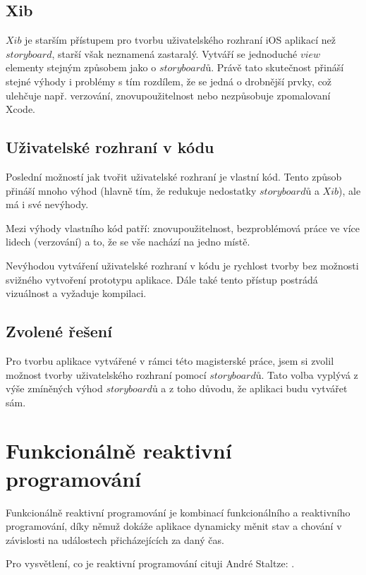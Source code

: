 \documentclass[thesis=M,czech]{FITthesis}[2012/06/26]
\begin{document}
\subsection{Xib}
$Xib$ je starším přístupem pro tvorbu uživatelského rozhraní iOS aplikací než $storyboard$, starší však neznamená zastaralý. Vytváří se jednoduché $view$ elementy stejným způsobem jako o $storyboardů$. Právě tato skutečnost přináší stejné výhody i problémy s tím rozdílem, že se jedná o drobnější prvky, což ulehčuje např. verzování, znovupoužitelnost nebo nezpůsobuje zpomalovaní Xcode. \cite{iOSUI} \cite{dominik}

\subsection{Uživatelské rozhraní v kódu}
Poslední možností jak tvořit uživatelské rozhraní je vlastní kód. Tento způsob přináší mnoho výhod (hlavně tím, že redukuje nedostatky $storyboardů$ a $Xib$), ale má i své nevýhody.

Mezi výhody vlastního kód patří: znovupoužitelnost, bezproblémová práce ve více lidech (verzování) a to, že se vše nachází na jedno místě. 

Nevýhodou vytváření uživatelské rozhraní v kódu je rychlost tvorby bez možnosti svižného vytvoření prototypu aplikace. Dále také tento přístup postrádá vizuálnost a vyžaduje kompilaci. \cite{iOSUI} \cite{dominik}

\subsection{Zvolené řešení}
Pro tvorbu aplikace vytvářené v rámci této magisterské práce, jsem si zvolil možnost tvorby uživatelského rozhraní pomocí $storyboardů$. Tato volba vyplývá z výše zmíněných výhod $storyboardů$ a z toho důvodu, že aplikaci budu vytvářet sám.

\section{Funkcionálně reaktivní programování}
Funkcionálně reaktivní programování je kombinací funkcionálního a reaktivního programování, díky němuž dokáže aplikace dynamicky měnit stav a chování v závislosti na událostech přicházejících za daný čas. \cite{nayebi2016swift}

Pro vysvětlení, co je reaktivní programování cituji André Staltze: . \cite{Ztaltz2014}
\end{document}

